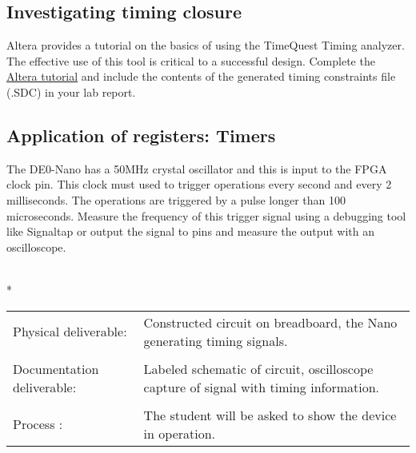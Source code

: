   \subsection{Investigating timing closure}
    Altera provides a tutorial on the basics of using the TimeQuest Timing analyzer. The effective use of this tool is critical to a successful design. Complete the \href{ftp://ftp.altera.com/up/pub/Altera_Material/13.0/Tutorials/Timequest.pdf}{Altera tutorial} and include the contents of the generated timing constraints file (.SDC) in your lab report.

  \subsection{Application of registers: Timers}
    The DE0-Nano has a 50MHz crystal oscillator and this is input to the FPGA clock pin.  This clock must used to trigger operations every second and every 2 milliseconds. The operations are triggered by a pulse longer than 100 microseconds. Measure the frequency  of this trigger signal using a debugging tool like Signaltap or output the signal to pins and measure the output with an oscilloscope.
     
    \vspace{15px}
    \begin{centering}
      \begin{fminipage}{.45\textwidth}
        \vspace{3px}
        \\*
        \vspace{10px}
        \begin{tabular}{p{1.8cm}  p{5.4cm}}
          \raggedright Physical deliverable:         & Constructed circuit on breadboard,  the Nano generating timing signals.\\
          \\
          \raggedright Documentation deliverable:    & Labeled schematic of circuit,  oscilloscope capture of signal with timing information.\\
          \\
          Process :                                  & The student will be asked to show the device in operation.

        \end{tabular}
      \end{fminipage}
    \end{centering} 

